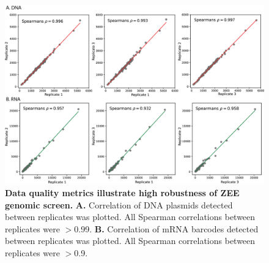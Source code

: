 \begin{figure}[p]
    \centering
    \includegraphics[scale=.75]{2_figures-and-files/FigS2_Data-QC.png}
    \caption[Data quality metrics illustrate high robustness of ZEE genomic screen]{\textbf{Data quality metrics illustrate high robustness of ZEE genomic screen.} \textbf{A.} Correlation of DNA plasmids detected between replicates was plotted. All Spearman correlations between replicates were $>$0.99. \textbf{B.} Correlation of mRNA barcodes detected between replicates was plotted. All Spearman correlations between replicates were $>$0.9.}
    \label{fig:supplement notochord data qc}
\end{figure}

